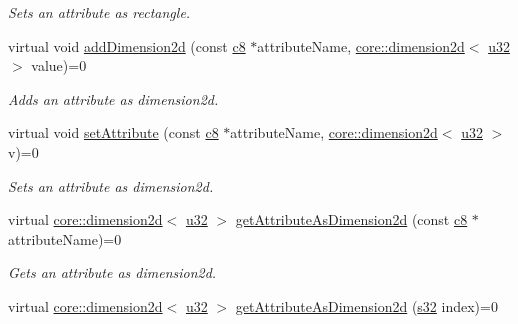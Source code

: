 \begin{DoxyCompactItemize}
\begin{DoxyCompactList}\small\item\em Sets an attribute as rectangle. \end{DoxyCompactList}\item 
\mbox{\label{classirr_1_1io_1_1IAttributes_a6ed7b4304a6aee37ecff2d51f9b56443}} 
virtual void \hyperlink{classirr_1_1io_1_1IAttributes_a6ed7b4304a6aee37ecff2d51f9b56443}{add\+Dimension2d} (const \hyperlink{namespaceirr_a9395eaea339bcb546b319e9c96bf7410}{c8} $\ast$attribute\+Name, \hyperlink{classirr_1_1core_1_1dimension2d}{core\+::dimension2d}$<$ \hyperlink{namespaceirr_a0416a53257075833e7002efd0a18e804}{u32} $>$ value)=0
\begin{DoxyCompactList}\small\item\em Adds an attribute as dimension2d. \end{DoxyCompactList}\item 
\mbox{\label{classirr_1_1io_1_1IAttributes_aec6b634f9c8f9f1f986ab2f8e4e8ed3f}} 
virtual void \hyperlink{classirr_1_1io_1_1IAttributes_aec6b634f9c8f9f1f986ab2f8e4e8ed3f}{set\+Attribute} (const \hyperlink{namespaceirr_a9395eaea339bcb546b319e9c96bf7410}{c8} $\ast$attribute\+Name, \hyperlink{classirr_1_1core_1_1dimension2d}{core\+::dimension2d}$<$ \hyperlink{namespaceirr_a0416a53257075833e7002efd0a18e804}{u32} $>$ v)=0
\begin{DoxyCompactList}\small\item\em Sets an attribute as dimension2d. \end{DoxyCompactList}\item 
virtual \hyperlink{classirr_1_1core_1_1dimension2d}{core\+::dimension2d}$<$ \hyperlink{namespaceirr_a0416a53257075833e7002efd0a18e804}{u32} $>$ \hyperlink{classirr_1_1io_1_1IAttributes_a150afece0c99c98668a8f21247f2396f}{get\+Attribute\+As\+Dimension2d} (const \hyperlink{namespaceirr_a9395eaea339bcb546b319e9c96bf7410}{c8} $\ast$attribute\+Name)=0
\begin{DoxyCompactList}\small\item\em Gets an attribute as dimension2d. \end{DoxyCompactList}\item 
virtual \hyperlink{classirr_1_1core_1_1dimension2d}{core\+::dimension2d}$<$ \hyperlink{namespaceirr_a0416a53257075833e7002efd0a18e804}{u32} $>$ \hyperlink{classirr_1_1io_1_1IAttributes_a07f89c0d3670df87242cf8b82a8c7e3f}{get\+Attribute\+As\+Dimension2d} (\hyperlink{namespaceirr_ac66849b7a6ed16e30ebede579f9b47c6}{s32} index)=0

\end{DoxyCompactItemize}
